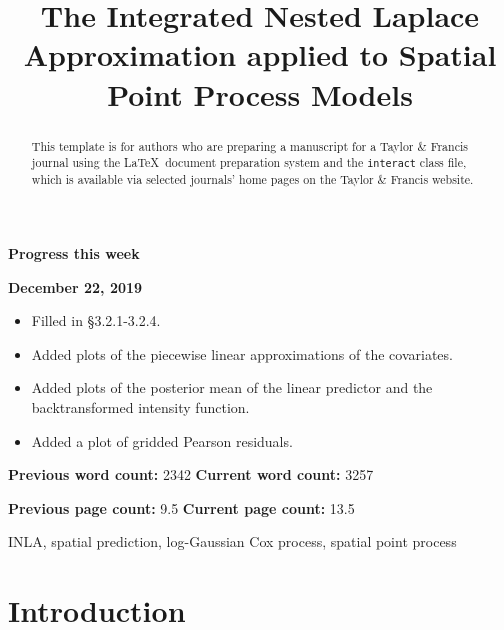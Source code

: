\documentclass[]{interact}
\begin{document}
{\Large\bf Progress this week}

{\large\bf December 22, 2019}

\begin{itemize}

\item Filled in \S 3.2.1-3.2.4.

\item Added plots of the piecewise linear approximations of the covariates.

\item Added plots of the posterior mean of the linear predictor and the
backtransformed intensity function.

\item Added a plot of gridded Pearson residuals.

\end{itemize}

\vfill

\textbf{Previous word count:} 2342 \hfill \textbf{Current word count:} 3257

\textbf{Previous page count:} 9.5 \hfill \textbf{Current page count:} 13.5

\pagebreak


\title{The Integrated Nested Laplace Approximation applied to Spatial Point Process Models}

\author{
}

\maketitle

\begin{abstract}
This template is for authors who are preparing a manuscript for a Taylor \& Francis journal using the \LaTeX\ document preparation system and the \texttt{interact} class file, which is available via selected journals' home pages on the Taylor \& Francis website.
\end{abstract}

\begin{keywords}
INLA, spatial prediction, log-Gaussian Cox process, spatial point process
\end{keywords}


\section{Introduction}
\end{document}
